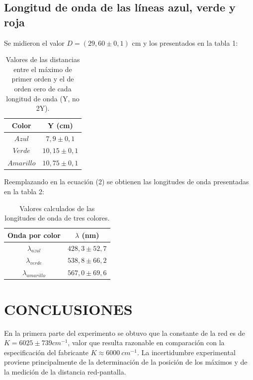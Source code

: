 \documentclass[12pt, a4paper]{article}
\begin{document}
\subsection{Longitud de onda de las líneas azul, verde y roja}
Se midieron el valor $D = (29,60 \pm 0,1)$ cm y los presentados en la tabla 1:

\begin{table}[H]
  \centering
  \begin{tabular}{|c|c|}
  \hline
  Color & Y (cm) \\
  \hline
  $Azul$  & $7,9 \pm 0,1$  \\ \hline
  $Verde$  & $10,15 \pm 0,1$ \\ \hline
  $Amarillo$  & $10,75 \pm 0,1$ \\ \hline
  \end{tabular}
  \caption{\centering Valores de las distancias entre el máximo de primer orden y el de orden cero de cada longitud de onda (Y, no 2Y).}
  \label{tabla1}
\end{table}

Reemplazando en la ecuación (2) se obtienen las longitudes de onda presentadas en la tabla 2:

\begin{table}[H]
  \centering
  \begin{tabular}{|c|c|}
  \hline
  Onda por color & $\lambda $ (nm)  \\
  \hline
  ${\lambda_{azul}}$  & $ 428,3 \pm 52,7$  \\ \hline
  ${\lambda_{verde}}$  & $ 538,8 \pm 66,2 $ \\ \hline
  ${\lambda_{amarillo}}$  & $ 567,0 \pm 69,6 $\\ \hline
  \end{tabular}
  \caption{\centering Valores calculados de las longitudes de onda de tres colores. }
  \label{tabla2}
\end{table}


\section{CONCLUSIONES}

En la primera parte del experimento se obtuvo que la constante de la red es de $K = 6025 \pm 739 cm^{-1}$, valor que resulta razonable 
en comparación con la especificación del fabricante $K\approx6000\ cm^{-1}$. La incertidumbre experimental proviene principalmente de la 
determinación de la posición de los máximos y de la medición de la distancia red-pantalla.
\end{document}
